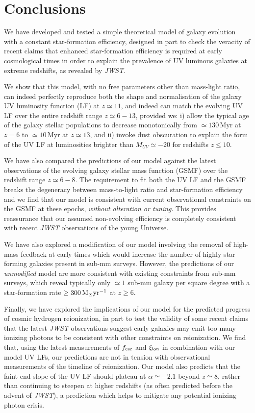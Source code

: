 \documentclass[fleqn,usenatbib]{mnras}
\begin{document}
\section{Conclusions}
\label{sec:conclusions}

We have developed and tested a simple theoretical model of galaxy evolution with a constant star-formation efficiency, designed in part to check the veracity of recent claims that enhanced star-formation efficiency is required at early cosmological times in order to explain the prevalence of UV luminous galaxies at extreme redshifts, as revealed by {\it JWST}.


We show that this model, with no free parameters other than mass-light ratio, can indeed perfectly reproduce both the shape and normalisation of the galaxy UV luminosity function (LF) at $z \simeq 11$, and indeed can match the evolving UV LF over the entire redshift range $z \simeq 6 -13$, provided we: i) allow the typical age of the galaxy stellar populations to decrease monotonically from $\simeq 130$\,Myr at $z = 6$ to $\simeq 10$\,Myr at $z \simeq 13$, and ii) invoke dust obscuration to explain the form of the UV LF at luminosities brighter than $M_{UV} \simeq -20$ for redshifts $z \leq 10$.



We have also compared the predictions of our model against the latest observations of the evolving galaxy stellar mass function (GSMF) over the redshift range $z \simeq 6 - 8$. The requirement to fit both the UV LF and the GSMF breaks the degeneracy between mass-to-light ratio and star-formation efficiency and we find that our model is consistent with current observational constraints on the GSMF at these epochs, {\it without alteration or tuning}. This provides reassurance that our assumed non-evolving efficiency is completely consistent with recent {\it JWST} observations of the young Universe.

We have also explored a modification of our model involving the removal of high-mass feedback at early times which would increase the number of highly star-forming galaxies present in sub-mm surveys. However, the predictions of our {\it unmodified} model are more consistent with existing constraints from sub-mm surveys, which reveal typically only $\simeq 1$ sub-mm galaxy per square degree with a star-formation rate $\ge 300\,{\rm M_{\odot} yr^{-1}}$ at $z \ge 6$. 

Finally, we have explored the implications of our model for the predicted progress of cosmic hydrogen reionization, in part to test the validity of some recent claims that the latest \textit{JWST} observations suggest early galaxies may emit too many ionizing photons to be consistent with other constraints on reionization. We find that, using the latest measurements of $f_{\rm esc}$ and $\xi_{\rm ion}$ in combination with our model UV LFs, our predictions are not in tension with observational measurements of the timeline of reionization. 
Our model also predicts that the faint-end slope of the UV LF should plateau at $\alpha \simeq -2.1$ beyond $z \simeq 8$, rather than continuing to steepen at higher redshifts (as often predicted before the advent of {\it JWST}), a prediction which helps to mitigate any potential ionizing photon crisis.
\end{document}
